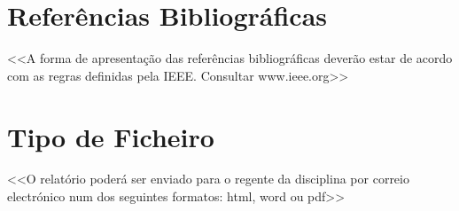     \section{Referências Bibliográficas}
        <<A forma de apresentação das referências bibliográficas deverão estar de acordo com as regras definidas pela IEEE. Consultar www.ieee.org>>
    \section{Tipo de Ficheiro}
        <<O relatório poderá ser enviado para o regente da disciplina por correio electrónico num dos seguintes formatos: html, word ou pdf>>
   
        
